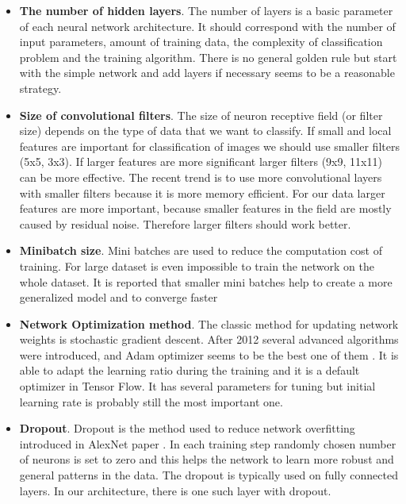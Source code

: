 \documentclass{article}
\begin{document}
\begin{itemize}
\item
  \textbf{The number of hidden layers}. The number of layers is a basic
  parameter of each neural network architecture. It should correspond
  with the number of input parameters, amount of training data, the
  complexity of classification problem and the training algorithm. There
  is no general golden rule but start with the simple network and add
  layers if necessary seems to be a reasonable strategy.

\item
  \textbf{Size of convolutional filters}. The size of neuron receptive
  field (or filter size) depends on the type of data that we want to
  classify. If small and local features are important for classification
  of images we should use smaller filters (5x5, 3x3). If larger features
  are more significant larger filters (9x9, 11x11) can be more
  effective. The recent trend is to use more convolutional layers with
  smaller filters because it is more memory efficient. For our data
  larger features are more important, because smaller features in the
  field are mostly caused by residual noise. Therefore larger filters
  should work better.
\item
  \textbf{Minibatch size}. Mini batches are used to reduce the
  computation cost of training. For large dataset is even impossible to
  train the network on the whole dataset. It is reported that smaller
  mini batches help to create a more generalized model and to converge
  faster \cite{minibatch}
\item
  \textbf{Network Optimization method}. The classic method for updating
  network weights is stochastic gradient descent. After 2012 several
  advanced algorithms were introduced, and Adam optimizer
  \cite{adam} seems to be the best one of
  them \cite{gradient-comparsion}. It is able to adapt
  the learning ratio during the training and it is a default optimizer
  in Tensor Flow. It has several parameters for tuning but initial
  learning rate is probably still the most important one.
\item
  \textbf{Dropout}. Dropout is the method used to reduce network
  overfitting introduced in AlexNet paper
  \cite{alexnet}.
  In each training step randomly chosen number of neurons is set to zero
  and this helps the network to learn more robust and general patterns
  in the data. The dropout is typically used on fully connected layers.
  In our architecture, there is one such layer with dropout.
\end{itemize}
\end{document}
